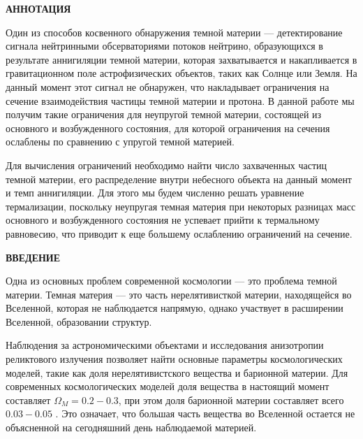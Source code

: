\newpage
\begin{center}
  \textbf{\large АННОТАЦИЯ}
\end{center}

Один из способов косвенного обнаружения темной материи --- детектирование сигнала нейтринными обсерваториями потоков нейтрино, образующихся в результате аннигиляции темной материи, которая захватывается и накапливается  в гравитационном поле астрофизических объектов, таких как Солнце или Земля. На данный момент этот сигнал не обнаружен, что накладывает ограничения на сечение взаимодействия частицы темной материи и протона. В данной работе мы получим такие ограничения для неупругой темной материи, состоящей из основного и возбужденного состояния, для которой ограничения на сечения ослаблены по сравнению с упругой темной материей. 

Для вычисления ограничений необходимо найти число захваченных частиц темной материи, его распределение внутри небесного объекта на данный момент и темп аннигиляции. Для этого мы будем численно решать уравнение термализации, поскольку неупругая темная материя при некоторых разницах масс основного и возбужденного состояния не успевает прийти к термальному равновесию, что приводит к еще большему ослаблению ограничений на сечение.

\onehalfspacing
\setcounter{page}{2}

\newpage
\renewcommand{\contentsname}{\centerline{\large СОДЕРЖАНИЕ}}
\tableofcontents

\newpage
\begin{center}
  \textbf{\large ВВЕДЕНИЕ}
\end{center}


Одна из основных проблем современной космологии --- это проблема темной материи.  Темная материя --- это часть нерелятивисткой материи, находящейся во Вселенной, которая не наблюдается напрямую, однако участвует в расширении Вселенной, образовании структур. 


Наблюдения за астрономическими объектами и исследования анизотропии реликтового излучения позволяет найти основные параметры космологических моделей, такие как доля нерелятивистского вещества и барионной материи. Для современных космологических моделей доля вещества в настоящий момент составляет $\Omega_M = 0.2-0.3$, при этом доля барионной материи составляет всего $0.03-0.05$ \cite{Cao_2023}. Это означает, что большая часть вещества во Вселенной остается не объясненной на сегодняшний день наблюдаемой материей.

